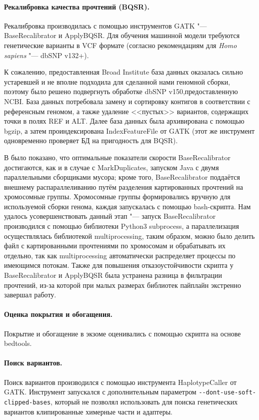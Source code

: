 \documentclass[a4paper,12pt]{article}
\begin{document}
\paragraph{Рекалибровка качества прочтений (BQSR).}
Рекалибровка производилась с помощью инструментов GATK "--- BaseRecalibrator и ApplyBQSR.
Для обучения машинной модели требуются генетические варианты в VCF формате (согласно рекомендациям для \textit{Homo sapiens} "--- dbSNP v132+).

К сожалению, предоставленная Broad Institute база данных оказалась сильно устаревшей и не вполне подходила для сделанной нами геномной сборки, поэтому было решено подвергнуть обработке dbSNP v150,предоставленную NCBI\cite{Sherry_2001}.
База данных потребовала замену и сортировку контигов в соответствии с референсным геномом, а также удаление <<пустых>> вариантов, содержащих точки в полях REF и ALT.
Далее база данных была архивирована с помощью bgzip, а затем проиндексирована IndexFeatureFile от GATK (этот же инструмент одновременно проверяет БД на пригодность для BQSR).

В \cite{Heldenbrand_2019} было показано, что оптимальные показатели скорости BaseRecalibrator достигаются, как и в случае с MarkDuplicates, запуском Java с двумя параллельными сборщиками мусора;
кроме того, BaseRecalibrator поддаётся внешнему распараллеливанию путём разделения картированных прочтений на хромосомные группы.
Хромосомные группы формировались вручную для используемой сборки генома, каждая запускалась с помощью bash-скрипта.
Нам удалось усовершенствовать данный этап "--- запуск BaseRecalibrator производился с помощью библиотеки Python3 subprocess, а параллелизация осуществлялась библиотекой multiprocessing, таким образом, можно было делить файл с картированными прочтениями по хромосомам и обрабатывать их отдельно, так как multiprocessing автоматически распределяет процессы по имеющимся потокам.
Также для повышения отказоустойчивости скрипта у BaseRecalibrator и ApplyBQSR была устранена разница в фильтрации прочтений, из-за которой при малых размерах библиотек пайплайн экстренно завершал работу.

\paragraph{Оценка покрытия и обогащения.}
Покрытие и обогащение в экзоме оценивались с помощью скрипта на основе bedtools\cite{Quinlan_2010}.

\paragraph{Поиск вариантов.}
Поиск вариантов производился с помощью инструмента HaplotypeCaller от GATK.
Инструмент запускался с дополнительным параметром \verb|--dont-use-soft-clipped-bases|, который не позволял использовать для поиска генетических вариантов клипированные химерные части и адаптеры.
\end{document}
